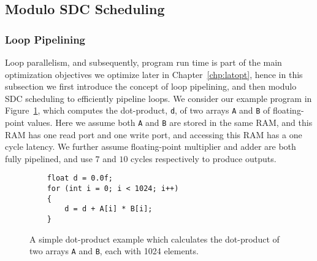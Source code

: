 \subsection{Modulo SDC Scheduling}
\label{bg:sub:modulo_sdc_scheduling}

\subsubsection{Loop Pipelining}

Loop parallelism, and subsequently, program run time is part of the main
optimization objectives we optimize later in Chapter~\ref{chp:latopt}, hence
in this subsection we first introduce the concept of loop pipelining, and
then modulo SDC scheduling to efficiently pipeline loops.  We consider our
example program in Figure~\ref{bg:lst:dotprod}, which computes the dot-product,
\verb|d|, of two arrays \verb|A| and \verb|B| of floating-point values.  Here
we assume both \verb|A| and \verb|B| are stored in the same RAM, and this RAM
has one read port and one write port, and accessing this RAM has a one cycle
latency.  We further assume floating-point multiplier and adder are both fully
pipelined, and use $7$ and $10$ cycles respectively to produce outputs.
\begin{figure}[ht]
    \centering
    \begin{minipage}{0.7\textwidth}
    \begin{lstlisting}
    float d = 0.0f;
    for (int i = 0; i < 1024; i++)
    {
        d = d + A[i] * B[i];
    }
    \end{lstlisting}
    \end{minipage}
    \caption{%
        A simple dot-product example which calculates the dot-product of two
        arrays \texttt{A} and \texttt{B}, each with 1024 elements.
    }\label{bg:lst:dotprod}
\end{figure}

